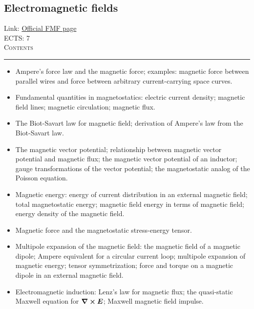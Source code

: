 \documentclass[11pt, a4paper]{article}
\newenvironment{course}[3]{
\subsection{#1}%
Link: \href{#2}{Official FMF page}\\%
ECTS: #3%
\vspace{1ex}
\\
{\large \textsc{Contents}}\\[-0.9ex]%
\rule{\textwidth}{0.5pt}
\vspace{-3ex}
}
{}
\newenvironment{chapter}[1]{
\begin{tcolorbox}[title=#1, breakable]
}
{\end{tcolorbox}}
\begin{document}
\begin{course}{Electromagnetic fields}{https://www.fmf.uni-lj.si/en/study-physics/programmes/1fiz/2020/7000777/courses/1133/}{7}
\begin{chapter}{Magnetostatics}
        \begin{itemize}
            
            \item Ampere's force law and the magnetic force; examples: magnetic force between parallel wires and force between arbitrary current-carrying space curves.

            \item Fundamental quantities in magnetostatics: electric current density; magnetic field lines; magnetic circulation; magnetic flux.

            \item The Biot-Savart law for magnetic field; derivation of Ampere's law from the Biot-Savart law.

            \item The magnetic vector potential; relationship between magnetic vector potential and magnetic flux; the magnetic vector potential of an inductor; gauge transformations of the vector potential; the magnetostatic analog of the Poisson equation.

            \item Magnetic energy: energy of current distribution in an external magnetic field; total magnetostatic energy; magnetic field energy in terms of magnetic field; energy density of the magnetic field.

            \item Magnetic force and the magnetostatic stress-energy tensor.

            \item Multipole expansion of the magnetic field: the magnetic field of a magnetic dipole; Ampere equivalent for a circular current loop; multipole expansion of magnetic energy; tensor symmetrization; force and torque on a magnetic dipole in an external magnetic field.

            
        \end{itemize}
    \end{chapter}

    \begin{chapter}{Quasi-static electromagnetic fields}

        \begin{itemize}
        
            \item Electromagnetic induction: Lenz's law for magnetic flux; the quasi-static Maxwell equation for $ \curl \bm{E} $; Maxwell magnetic field impulse.


\end{itemize}
\end{chapter}
\end{course}
\end{document}
